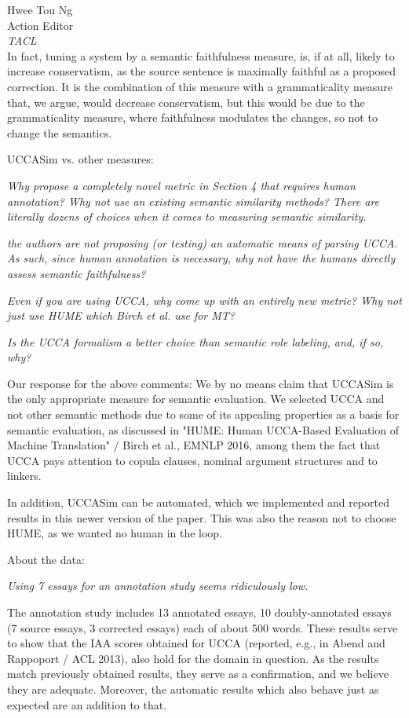 \documentclass[11pt,letterpaper]{letter}
\begin{document}
\begin{letter}{%
Hwee Tou Ng\\
Action Editor\\
{\em TACL}\\
}
In fact, tuning a system by a semantic faithfulness measure, is, if at all, likely to increase conservatism, as the source sentence is maximally faithful as a proposed correction. It is the combination of this measure with a grammaticality measure that, we argue, would decrease conservatism, but this would be due to the grammaticality measure, where faithfulness modulates the changes, so not to change the semantics. 

UCCASim vs. other measures:

\emph{Why propose a completely novel metric in Section 4 that requires human
	annotation? Why not use an existing semantic similarity methods? There are
	literally dozens of choices when it comes to measuring semantic similarity.}

	\emph{the authors are not proposing (or
	testing) an automatic means of parsing UCCA. As such, since human annotation
	is necessary, why not have the humans directly assess semantic faithfulness?}

\emph{Even if you are using UCCA, why come up with an entirely new metric? Why not just use HUME which Birch et al. use for MT? }


\emph {Is the UCCA formalism a better choice than semantic role labeling, and, if
	so, why?
}

Our response for the above comments:
We by no means claim that UCCASim is the only appropriate measure for semantic evaluation. We selected UCCA and not other semantic methods due to some of its appealing properties as a basis for semantic evaluation, as discussed in "HUME: Human UCCA-Based Evaluation of Machine Translation" / Birch et al., EMNLP 2016, among them the fact that UCCA pays attention to copula clauses, nominal argument structures and to linkers. 

In addition, UCCASim can be automated, which we implemented and reported results in this newer version of the paper. This was also the reason not to choose HUME, as we wanted no human in the loop.

About the data:

\emph{ Using 7 essays for an annotation study seems ridiculously low.}

The annotation study includes 13 annotated essays, 10 doubly-annotated essays (7 source essays, 3 corrected essays) each of about 500 words. These results serve to show that the IAA scores obtained for UCCA (reported, e.g., in Abend and Rappoport / ACL 2013), also hold for the domain in question. As the results match previously obtained results, they serve as a confirmation, and we believe they are adequate. Moreover, the automatic results which also behave just as expected are an addition to that.


\end{letter}
\end{document}

